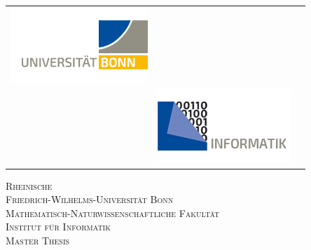 \begin{titlepage}
		\begin{center}
			\setlength{\tabcolsep}{0pt}
			\begin{tabular}{>{\raggedleft}m{2.5cm}>{\centering}m{\dimexpr\textwidth - 5cm\relax}>{\raggedright}m{2.5cm}}
				\includegraphics[width=\linewidth]{chapters/figures/uni_bonn_logo_web.png}%
				&%
				\textbf{\large } \\[5pt]%
				\textbf{\large}%
				&%
				\includegraphics[width=\linewidth]{chapters/figures/institutelogo.png} 
			\end{tabular}
			
			
			\textsc{\LARGE Rheinische\\[5mm] Friedrich-Wilhelms-Universität Bonn}\\[1.0cm]
			
			\textsc{\Large Mathematisch-Naturwissenschaftliche Fakultät}\\[1.0cm]
			\textsc{\Large Institut für Informatik}\\[1.0cm]
			\textsc{\Large Master Thesis}\\[1.5cm]
			

\end{center}
\end{titlepage}
